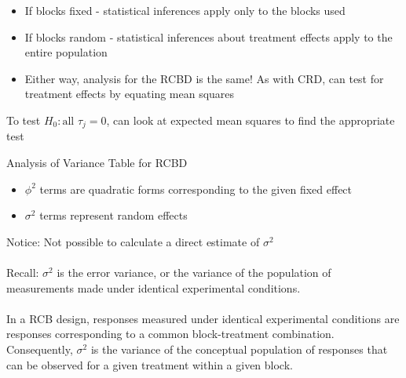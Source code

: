 \newpage

\begin{itemize}
        \item{If blocks fixed - statistical inferences apply only to the blocks used}
        \item{If blocks random - statistical inferences about treatment effects apply to the entire population}
        \item{Either way, analysis for the RCBD is the same!  As with CRD, can test for treatment effects by equating mean squares}\\
\end{itemize}
To test $H_{0}: \text{all } \tau_{j}=0$, can look at expected mean squares to find the appropriate test
	
\begin{center}Analysis of Variance Table for RCBD\end{center}
    \begin{itemize}
    	\item{$\phi^2$ terms are quadratic forms corresponding to the given fixed effect}
    	\item{$\sigma^2$ terms represent random effects}
    \end{itemize}
		
Notice:  Not possible to calculate a direct estimate of $\sigma^2$\\~\\
Recall: $\sigma^2$ is the error variance, or the variance of the population of measurements made under identical experimental conditions.\\~\\

In a RCB design, responses measured under identical experimental conditions are responses corresponding to a common block-treatment combination.  Consequently, $\sigma^2$ is the variance of the conceptual population of responses that can be observed for a given treatment within a given block.\\~\\

